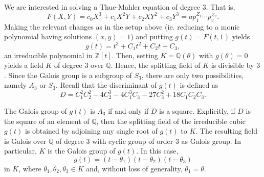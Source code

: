 We are interested in solving a Thue-Mahler equation of degree $3$. That is, 
\[F(X,Y) = c_0X^3 + c_1X^2Y + c_2XY^2 + c_3Y^3 = ap_1^{Z_1}\cdots p_v^{Z_v}.\]
Making the relevant changes as in the setup above (ie. reducing to a monic polynomial having solutions $(x,y) = 1$) and putting $g(t) = F(t,1)$ yields
\[g(t) = t^3 + C_1t^2 + C_2t + C_3,\]
an irreducible polynomial in $\mathbb{Z}[t]$. Then, setting $K = \mathbb{Q}(\theta)$ with $g(\theta) = 0$ yields a field $K$ of degree $3$ over $\mathbb{Q}$. Hence, the splitting field of $K$ is divisible by $3$. Since the Galois group is a subgroup of $S_3$, there are only two possibilities, namely $A_3$ or $S_3$. Recall that the discriminant of $g(t)$ is defined as 
\[D = C_1^2C_2^2 - 4C_2^3 - 4C_1^3C_3 - 27C_3^2 + 18C_1C_2C_3.\]

The Galois group of $g(t)$ is $A_3$ if and only if $D$ is a square. Explicitly, if $D$ is the square of an element of $\mathbb{Q}$, then the splitting field of the irreducible cubic $g(t)$ is obtained by adjoining any single root of $g(t)$ to $K$. The resulting field is Galois over $\mathbb{Q}$ of degree $3$ with cyclic group of order $3$ as Galois group. In particular, $K$ is the Galois group of $g(t)$. In this case, 
\[g(t) = (t - \theta_1)(t - \theta_2)(t - \theta_3)\]
in $K$, where $\theta_1, \theta_2, \theta_3 \in K$ and, without loss of generality, $\theta_1 = \theta$.  

